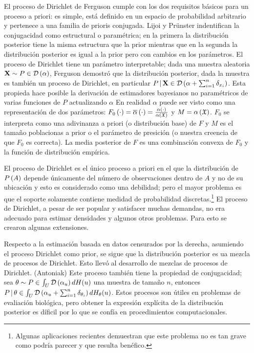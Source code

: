 \documentclass[runningheads,a4paper]{article}
\begin{document}
El proceso de Dirichlet de Ferguson cumple con los dos requisitos básicos para un proceso a priori: es simple, está definido en %
un espacio de probabilidad arbitrario y pertenece a una familia de prioris conjugada. Lijoi y Prünster indentifican la %
conjugacidad como estructural o paramétrica; en la primera la distribución posterior tiene la misma estructura que la prior %
mientras que en la segunda la distribución posterior es igual a la prior pero con cambios en los parámetros. El proceso de %
Dirichlet tiene un parámetro interpretable; dada una muestra aleatoria $\mathbf{X} \sim P \in \mathcal{D}\left( \alpha \right)$, Ferguson demostró %
que la distribución posterior, dada la muestra es también un proceso de Dirichlet, en particular $P \,|\,\mathbf{X} \in \D%
\Pp{\alpha + \sum_{i = 1}^{n} \delta_{x_{i}}}$. Esta propieda hace posible la derivación de estimadores bayesianos no paramétricos %
de varias funciones de $P$ actualizando $\alpha$ En realidad $\alpha$ puede ser visto como una representación de dos parámetros: %
$F_{0}\left( \cdot \right) = \overline{\alpha}\left( \cdot \right) = \frac{\alpha\left( \cdot \right)}{\alpha\left( \mathfrak{X} \right)}$ y $M = \alpha\left( \mathfrak{X} \right)$. $F_{0}$ se %
interpreta como una adivinanza a priori (o distribución base) de $F$ y $M$ es el tamaño poblacionas a prior o el parámetro de %
presición (o nuestra creencia de que $F_{0}$ es correcta). La media posterior de $F$ es una combinación convexa de $F_{0}$ y la %
función de distribución empírica. 

El proceso de Dirichlet es el único proceso a priori en el que la distribución de $P\left( A \right)$ depende únicamente del número de %
observaciones dentro de $A$ y no de su ubicación y esto es considerado como una debilidad; pero el mayor problema es que el %
soporte solamente contiene medidad de probabilidad discretas.\footnote{Algunas aplicaciones recientes demuestran que este problema %
no es tan grave como podría parecer y que resulta benéfico.} El proceso de Dirichlet, a pesar de ser popular y satisfacer muchas %
demandas, no era adecuado para estimar densidades y algunos otros problemas. Para esto se crearon algunas extensiones. 

Respecto a la estimación basada en datos censurados por la derecha, asumiendo el proceso Dirichlet como prior, se sigue que %
la distribución posterior es ua mezcla de procesos de Dirichlet. Esto llevó al desarrollo de mezclas de procesos de Dirichlet. %
(Antoniak) Este proceso también tiene la propiedad de conjugacidad; sea $\mathbf{\theta} \sim P \in \int_{U} \D\Pp{\alpha_{u}} %
dH(u)$ una muestra de tamaño $n$, entonces $P \,|\, \mathbf{\theta} \in \int_{U} \D\Pp{\alpha_{u} + \sum_{i = 1}^{n} %
\delta_{\theta_{i}}} dH_{\mathbf{\theta}}(u)$. Estos procesos son útiles en problemas de evaliación biológica, pero obtener %
la expresión explícita de la distribución posterior es díficil por lo que se confía en procedimientos computacionales.
\end{document}
